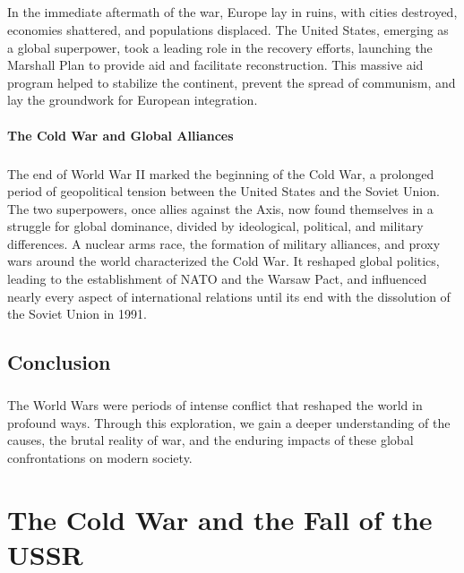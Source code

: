 \documentclass{book}
\begin{document}
\paragraph{}
In the immediate aftermath of the war, Europe lay in ruins, with cities destroyed, economies shattered, and populations displaced. The United States, emerging as a global superpower, took a leading role in the recovery efforts, launching the Marshall Plan to provide aid and facilitate reconstruction. This massive aid program helped to stabilize the continent, prevent the spread of communism, and lay the groundwork for European integration. 

\subsubsection*{The Cold War and Global Alliances}
\paragraph{}
The end of World War II marked the beginning of the Cold War, a prolonged period of geopolitical tension between the United States and the Soviet Union. The two superpowers, once allies against the Axis, now found themselves in a struggle for global dominance, divided by ideological, political, and military differences. A nuclear arms race, the formation of military alliances, and proxy wars around the world characterized the Cold War. It reshaped global politics, leading to the establishment of NATO and the Warsaw Pact, and influenced nearly every aspect of international relations until its end with the dissolution of the Soviet Union in 1991. 

\section*{Conclusion}
\paragraph{}
The World Wars were periods of intense conflict that reshaped the world in profound ways. Through this exploration, we gain a deeper understanding of the causes, the brutal reality of war, and the enduring impacts of these global confrontations on modern society.

\chapter{The Cold War and the Fall of the USSR}
\end{document}

